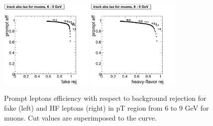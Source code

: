 \begin{figure}[htbp]
\begin{center}
 \includegraphics[width = 0.4\textwidth]{pictures/bkgdRej_sigEff/onlyTrack_muon_fake_ptCut1_ptCut2.png}
\includegraphics[width = 0.4\textwidth]{pictures/bkgdRej_sigEff/onlyTrack_muon_nonPrompt_ptCut1_ptCut2.png}
\caption{\small{Prompt leptons efficiency with respect to background 
rejection for fake (left) and HF leptons (right) in pT region
from 6 to 9 GeV for muons. 
Cut values are superimposed to the curve.}\label{fig:rej_mu2}}
\end{center}
\end{figure}

